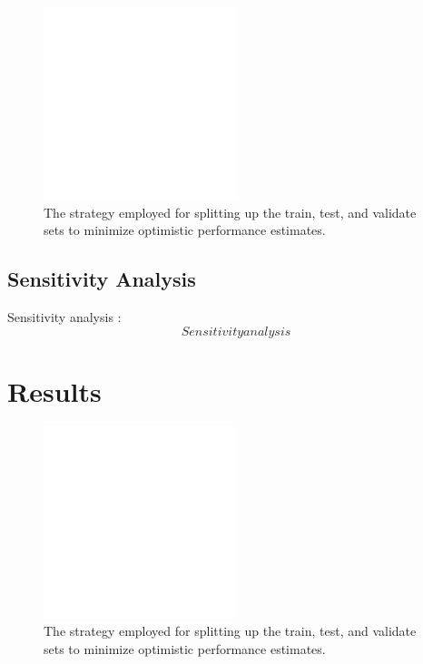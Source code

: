 \documentclass[twocolumn,draft]{article}
\begin{document}
\begin{figure}[!htbp]
\centering
\includegraphics[width=0.5\textwidth]{figures/placeholder}
\caption{The strategy employed for splitting up the train, test, and validate sets to minimize optimistic performance estimates.}
\label{fig:data-split}
\end{figure}

\subsection{Sensitivity Analysis}
Sensitivity analysis \cite{Zurada1994}:
\begin{equation}
Sensitivity analysis
\end{equation}

\section{Results}

\begin{figure}[!htbp]
\centering
\includegraphics[width=0.5\textwidth]{figures/placeholder}
\caption{The strategy employed for splitting up the train, test, and validate sets to minimize optimistic performance estimates.}
\label{tbl:frame-shuffle}
\end{figure}
\end{document}
